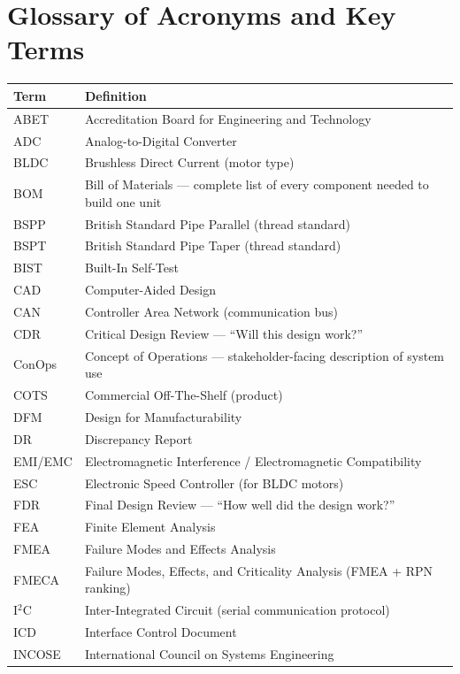 \documentclass[11pt,letterpaper,twoside,openany]{book}
\begin{document}
\backmatter

\FloatBarrier
\chapter*{Glossary of Acronyms and Key Terms}

\begin{longtable}{l p{12cm}}
\toprule
\textbf{Term} & \textbf{Definition} \\
\midrule
\endhead
ABET & Accreditation Board for Engineering and Technology \\
ADC & Analog-to-Digital Converter \\
BLDC & Brushless Direct Current (motor type) \\
BOM & Bill of Materials --- complete list of every component needed to build one unit \\
BSPP & British Standard Pipe Parallel (thread standard) \\
BSPT & British Standard Pipe Taper (thread standard) \\
BIST & Built-In Self-Test \\
CAD & Computer-Aided Design \\
CAN & Controller Area Network (communication bus) \\
CDR & Critical Design Review --- ``Will this design work?'' \\
ConOps & Concept of Operations --- stakeholder-facing description of system use \\
COTS & Commercial Off-The-Shelf (product) \\
DFM & Design for Manufacturability \\
DR & Discrepancy Report \\
EMI/EMC & Electromagnetic Interference / Electromagnetic Compatibility \\
ESC & Electronic Speed Controller (for BLDC motors) \\
FDR & Final Design Review --- ``How well did the design work?'' \\
FEA & Finite Element Analysis \\
FMEA & Failure Modes and Effects Analysis \\
FMECA & Failure Modes, Effects, and Criticality Analysis (FMEA + RPN ranking) \\
I$^2$C & Inter-Integrated Circuit (serial communication protocol) \\
ICD & Interface Control Document \\
INCOSE & International Council on Systems Engineering \\

\end{longtable}
\end{document}
